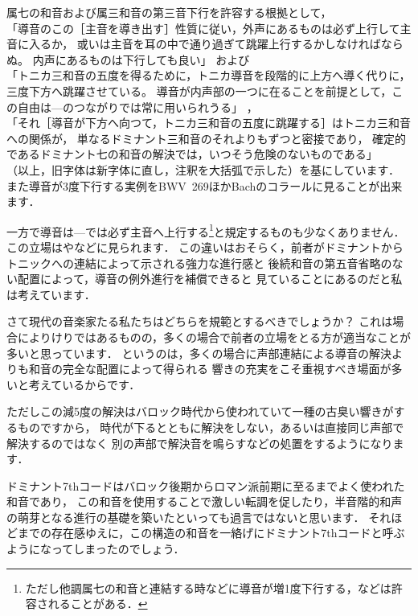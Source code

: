 \documentclass[dvipdfmx,uplatex,b5paper,openany,jbase=12Q,nomag*,textwidth-limit=44%
               ]{gachimuchi}[2020/05/05]
\begin{document}
\begin{NB}
  属七の和音および属三和音の第三音下行を許容する根拠として，\\
  「導音のこの［主音を導き出す］性質に従い，外声にあるものは必ず上行して主音に入るか，
  或いは主音を耳の中で通り過ぎて跳躍上行するかしなければならぬ。
  内声にあるものは下行しても良い」
  \cite[p.~23]{chHASEGAWA1}および\\
  「トニカ三和音の五度を得るために，トニカ導音を段階的に上方へ導く代りに，三度下方へ跳躍させている。
  導音が内声部の一つに在ることを前提として，この自由は\Gnv---\Gni のつながりでは常に用いられうる」
  \cite[p.~23]{chTHUILLE1}，\\
  「それ［導音が下方へ向つて，トニカ三和音の五度に跳躍する］はトニカ三和音への関係が，
  単なるドミナント三和音のそれよりもずつと密接であり，
  確定的であるドミナント七の和音の解決では，いつそう危険のないものである」
  \cite[p.~74]{chTHUILLE1}\\
  （以上，旧字体は新字体に直し，注釈を大括弧で示した）を基にしています．
  また導音が3度下行する実例をBWV~269ほかBachのコラールに見ることが出来ます．
  
  一方で導音は\Gnv---\Gni では必ず主音へ上行する\footnote{
    ただし他調属七の和音と連結する時などに導音が増1度下行する，などは許容されることがある．
  }と規定するものも少なくありません．
  この立場はやなどに見られます．
  この違いはおそらく，前者がドミナントからトニックへの連結によって示される強力な進行感と
  後続和音の第五音省略のない配置によって，導音の例外進行を補償できると
  見ていることにあるのだと私は考えています．
  
  さて現代の音楽家たる私たちはどちらを規範とするべきでしょうか？\<\zwspace
  これは場合によりけりではあるものの，多くの場合で前者の立場をとる方が適当なことが多いと思っています．
  というのは，多くの場合に声部連結による導音の解決よりも和音の完全な配置によって得られる
  響きの充実をこそ重視すべき場面が多いと考えているからです．
\end{NB}

ただしこの減5度の解決はバロック時代から使われていて一種の古臭い響きがするものですから，
時代が下るとともに解決をしない，あるいは直接同じ声部で解決するのではなく
別の声部で解決音を鳴らすなどの処置をするようになります．

\begin{Yodan}
ドミナント7thコードはバロック後期からロマン派前期に至るまでよく使われた和音であり，
この和音を使用することで激しい転調を促したり，半音階的和声の萌芽となる進行の基礎を築いたといっても過言ではないと思います．
それほどまでの存在感ゆえに，この構造の和音を一絡げにドミナント7thコードと呼ぶようになってしまったのでしょう．


\end{Yodan}
\end{document}
